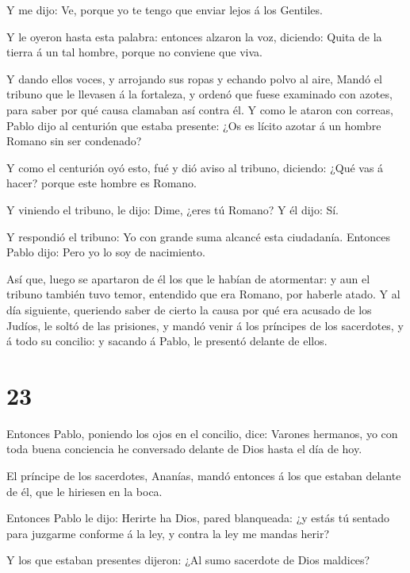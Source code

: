  Y me dijo: Ve, porque yo te tengo que enviar lejos á los
Gentiles.

 Y le oyeron hasta esta palabra: entonces alzaron la voz,
diciendo: Quita de la tierra á un tal hombre, porque no conviene que
viva.

 Y dando ellos voces, y arrojando sus ropas y echando polvo
al aire,  Mandó el tribuno que le llevasen á la fortaleza,
y ordenó que fuese examinado con azotes, para saber por qué causa
clamaban así contra él.  Y como le ataron con correas,
Pablo dijo al centurión que estaba presente: ¿Os es lícito azotar á un
hombre Romano sin ser condenado?

 Y como el centurión oyó esto, fué y dió aviso al tribuno,
diciendo: ¿Qué vas á hacer? porque este hombre es Romano.

 Y viniendo el tribuno, le dijo: Dime, ¿eres tú Romano? Y
él dijo: Sí.

 Y respondió el tribuno: Yo con grande suma alcancé esta
ciudadanía. Entonces Pablo dijo: Pero yo lo soy de nacimiento.

 Así que, luego se apartaron de él los que le habían de
atormentar: y aun el tribuno también tuvo temor, entendido que era
Romano, por haberle atado.  Y al día siguiente, queriendo
saber de cierto la causa por qué era acusado de los Judíos, le soltó de
las prisiones, y mandó venir á los príncipes de los sacerdotes, y á todo
su concilio: y sacando á Pablo, le presentó delante de ellos.

\hypertarget{section-22}{%
\section{23}\label{section-22}}

 Entonces Pablo, poniendo los ojos en el concilio, dice:
Varones hermanos, yo con toda buena conciencia he conversado delante de
Dios hasta el día de hoy.

 El príncipe de los sacerdotes, Ananías, mandó entonces á
los que estaban delante de él, que le hiriesen en la boca.

 Entonces Pablo le dijo: Herirte ha Dios, pared blanqueada:
¿y estás tú sentado para juzgarme conforme á la ley, y contra la ley me
mandas herir?

 Y los que estaban presentes dijeron: ¿Al sumo sacerdote de
Dios maldices?

